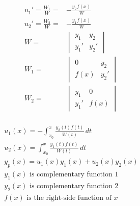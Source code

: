 \documentclass[12pt]{article}
\begin{document}
\begin{multicols}{2}

  \begin{equation}
    \begin{split}
      u_1'=\frac{W_1}{W}=&-\frac{y_2f(x)}{W}\\
      u_2'=\frac{W_2}{W}=&-\frac{y_1f(x)}{W}\\
      W =&\begin{vmatrix} y_1 & y_2 \\ y_1' & y_2'  \end{vmatrix}\\
      W_1 =&\begin{vmatrix} 0 & y_2 \\ f(x) & y_2'  \end{vmatrix}\\
      W_2 =&\begin{vmatrix} y_1 & 0 \\ y_1' & f(x)  \end{vmatrix}\\
    \end{split}
    \label{5}
  \end{equation}

  \begin{equation}
    \begin{split}
      u_1(x)=-\int_{x_0}^x \frac{y_2(t)f(t)}{W(t)}\,dt\\
      u_2(x)=\int_{x_0}^x \frac{y_1(t)f(t)}{W(t)}\,dt\\
      y_p(x)=u_1(x)y_1(x)+u_2(x)y_2(x)\\
      \text{$y_1(x)$ is complementary function 1}\\
    \text{$y_2(x)$ is complementary function 2}\\
    \text{$f(x)$ is the right-side function of } x\\
    \end{split}
    \label{6}
  \end{equation}

\end{multicols}
\end{document}
